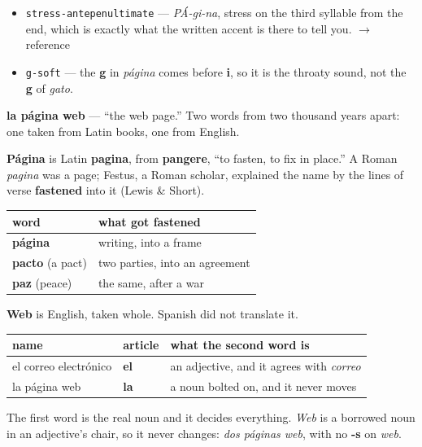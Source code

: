 \begin{sounds}
\begin{itemize}
\raggedright
  \item \texttt{stress-antepenultimate} — \emph{PÁ-gi-na}, stress on the third syllable from the end, which is exactly what the written accent is there to tell you. $\to$ reference
  \item \texttt{g-soft} — the \textbf{g} in \emph{página} comes before \textbf{i}, so it is the throaty sound, not the \textbf{g} of \emph{gato}.
\end{itemize}
\end{sounds}

\begin{cousinweb}
\textbf{la página web} — \textquotedblleft{}the web page.\textquotedblright{} Two words from two thousand years apart: one taken from Latin books, one from English.

\textbf{Página} is Latin \textbf{pagina}, from \textbf{pangere}, \textquotedblleft{}to fasten, to fix in place.\textquotedblright{} A Roman \emph{pagina} was a page; Festus, a Roman scholar, explained the name by the lines of verse \textbf{fastened} into it (Lewis \& Short).

\noindent
\begin{tabularx}{\linewidth}{@{}>{\raggedright\arraybackslash}X>{\raggedright\arraybackslash}X@{}}
\toprule
\textbf{word} & \textbf{what got fastened} \\
\midrule
\textbf{página} & writing, into a frame \\
\textbf{pacto} (a pact) & two parties, into an agreement \\
\textbf{paz} (peace) & the same, after a war \\
\bottomrule
\end{tabularx}

\textbf{Web} is English, taken whole. Spanish did not translate it.
\end{cousinweb}

\begin{grammarlens}[title={Grammar Lens: which half carries the gender}]
\noindent
\begin{tabularx}{\linewidth}{@{}>{\raggedright\arraybackslash}X>{\raggedright\arraybackslash}X>{\raggedright\arraybackslash}X@{}}
\toprule
\textbf{name} & \textbf{article} & \textbf{what the second word is} \\
\midrule
el correo electrónico & \textbf{el} & an adjective, and it agrees with \emph{correo} \\
la página web & \textbf{la} & a noun bolted on, and it never moves \\
\bottomrule
\end{tabularx}

The first word is the real noun and it decides everything. \emph{Web} is a borrowed noun in an adjective's chair, so it never changes: \emph{dos páginas web}, with no \textbf{-s} on \emph{web}.
\end{grammarlens}

